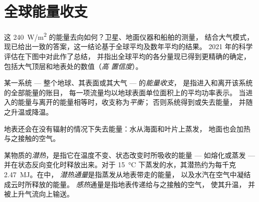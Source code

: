 \section{全球能量收支}

这 \qty{240}{W/m^2} 的能量去向如何？卫星、地面仪器和船舶的测量，
结合大气模式，
现已给出一致的答案，这一结论基于全球平均及数年平均的结果。
2021 年的科学评估在下图中对此作了总结，
并指出全球平均的各分量现已得到更精确的确定，
包括大气顶层和地表处的数值（\emph{高
置信度}）。

\begin{definition}[能量收支]\label{def:g10:earth-energy-budget:energy-budget}
某一系统 --- 整个地球、其表面或其大气 --- 的\emph{能量收支}，
是指进入和离开该系统的全部能量的账目，
每一项流量均以地球表面单位面积上的平均功率表示。
当进入的能量与离开的能量相等时，收支称为\emph{平衡}；
否则系统得到或失去能量，
并随之升温或降温。
\end{definition}

地表还会在没有辐射的情况下失去能量：水从海面和叶片上蒸发，
地面也会加热与之接触的空气。

\begin{definition}[潜热；感热]\label{def:g10:earth-energy-budget:latent-heat}
某物质的\emph{潜热}，是指它在温度不变、状态改变时所吸收的能量 ---
如熔化或蒸发 ---
并在状态反向变化时释放出来。对于
\qty{15}{\degreeCelsius} 下蒸发的水，其潜热约为每千克 \qty{2.47}{MJ}。在中，
\emph{潜热通量}是指蒸发从地表带走的能量，
以及水汽在空气中凝结成云时所释放的能量。
\emph{感热}通量是指地表传递给与之接触的空气，
使其升温，
并被上升气流向上输送。
\end{definition}

